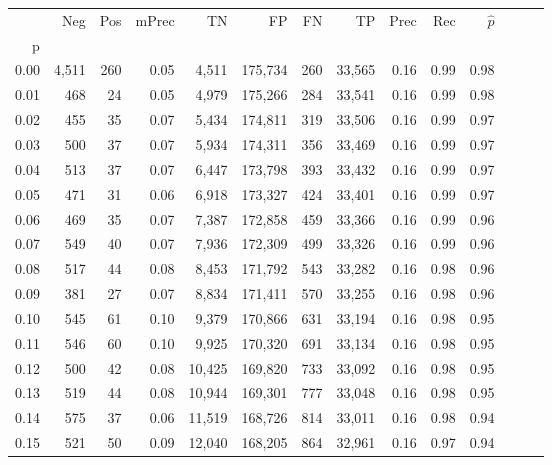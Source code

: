 \begin{tabular}{rrrrrrrrrrrrrr}
\toprule
{} &    Neg &    Pos & mPrec &       TN &       FP &      FN &      TP &  Prec &   Rec & $\hat{p}$ \\
p    &        &        &       &          &          &         &         &       &       &           \\
\midrule
0.00 &  4,511 &    260 &  0.05 &    4,511 &  175,734 &     260 &  33,565 &  0.16 &  0.99 &      0.98 \\
0.01 &    468 &     24 &  0.05 &    4,979 &  175,266 &     284 &  33,541 &  0.16 &  0.99 &      0.98 \\
0.02 &    455 &     35 &  0.07 &    5,434 &  174,811 &     319 &  33,506 &  0.16 &  0.99 &      0.97 \\
0.03 &    500 &     37 &  0.07 &    5,934 &  174,311 &     356 &  33,469 &  0.16 &  0.99 &      0.97 \\
0.04 &    513 &     37 &  0.07 &    6,447 &  173,798 &     393 &  33,432 &  0.16 &  0.99 &      0.97 \\
0.05 &    471 &     31 &  0.06 &    6,918 &  173,327 &     424 &  33,401 &  0.16 &  0.99 &      0.97 \\
0.06 &    469 &     35 &  0.07 &    7,387 &  172,858 &     459 &  33,366 &  0.16 &  0.99 &      0.96 \\
0.07 &    549 &     40 &  0.07 &    7,936 &  172,309 &     499 &  33,326 &  0.16 &  0.99 &      0.96 \\
0.08 &    517 &     44 &  0.08 &    8,453 &  171,792 &     543 &  33,282 &  0.16 &  0.98 &      0.96 \\
0.09 &    381 &     27 &  0.07 &    8,834 &  171,411 &     570 &  33,255 &  0.16 &  0.98 &      0.96 \\
0.10 &    545 &     61 &  0.10 &    9,379 &  170,866 &     631 &  33,194 &  0.16 &  0.98 &      0.95 \\
0.11 &    546 &     60 &  0.10 &    9,925 &  170,320 &     691 &  33,134 &  0.16 &  0.98 &      0.95 \\
0.12 &    500 &     42 &  0.08 &   10,425 &  169,820 &     733 &  33,092 &  0.16 &  0.98 &      0.95 \\
0.13 &    519 &     44 &  0.08 &   10,944 &  169,301 &     777 &  33,048 &  0.16 &  0.98 &      0.95 \\
0.14 &    575 &     37 &  0.06 &   11,519 &  168,726 &     814 &  33,011 &  0.16 &  0.98 &      0.94 \\
0.15 &    521 &     50 &  0.09 &   12,040 &  168,205 &     864 &  32,961 &  0.16 &  0.97 &      0.94 \\

\end{tabular}
